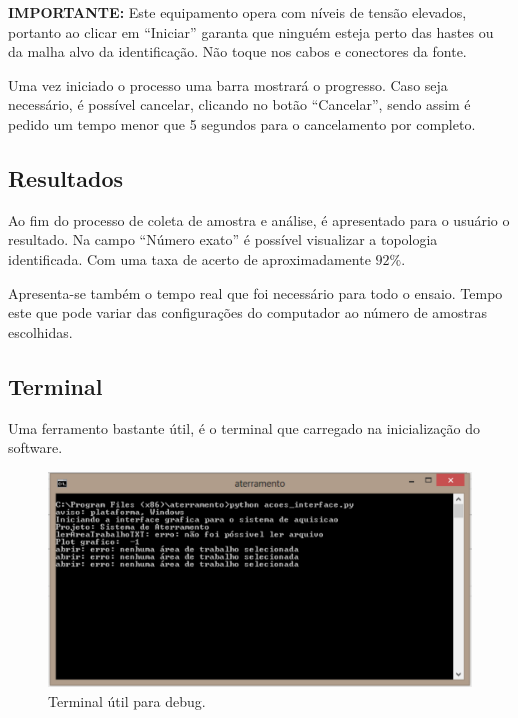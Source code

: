 \documentclass[a4paper, 10pt]{article}
\begin{document}
\textbf{IMPORTANTE:} Este equipamento opera com níveis de tensão elevados, portanto ao clicar em 
``Iniciar'' garanta que ninguém esteja perto das hastes ou da malha alvo da identificação. Não toque
nos cabos e conectores da fonte.

Uma vez iniciado o processo uma barra mostrará o progresso. Caso seja necessário, é possível cancelar, 
clicando no botão ``Cancelar'', sendo assim é pedido um tempo menor que 5 segundos para o cancelamento
por completo.

\subsection{Resultados}


Ao fim do processo de coleta de amostra e análise, é apresentado para o usuário o resultado. 
Na campo ``Número exato'' é possível visualizar a topologia identificada. Com uma taxa de 
acerto de aproximadamente $92 \%$.

Apresenta-se também o tempo real que foi necessário para todo o ensaio. Tempo este que pode variar
das configurações do computador  ao número de amostras escolhidas.

\subsection{Terminal}

Uma ferramento bastante útil, é o terminal que carregado na inicialização do software.

\begin{figure}[!h]
    \caption{\label{fig_terminal}Terminal útil para debug.}
	    \begin{center}
            \includegraphics[scale=0.3]{../fotos/execucao/terminal.pdf}
	    \end{center}
\end{figure}
\end{document}
